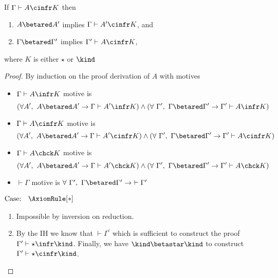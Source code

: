 
\begin{theorem}
    If $\Gamma \vdash A \cinfr K$ then 
    \begin{enumerate}
        \item {
            $A \betared A^\prime$ implies $\Gamma \vdash A^\prime \cinfr K$, and
        }
        \item {
            $\Gamma \betared \Gamma^\prime$ implies $\Gamma^\prime \vdash A \cinfr K$,
        }
    \end{enumerate}
    where $K$ is either $\star$ or $\kind$
\end{theorem}
\begin{proof}
    By induction on the proof derivation of $A$ with motives
    \begin{itemize}
        \item {
            $\Gamma \vdash A \infr K$ motive is
            $$(\forall A^\prime,\ A \betared A^\prime \to \Gamma \vdash A^\prime \infr K) \wedge (\forall\ \Gamma^\prime,\ \Gamma \betared \Gamma^\prime \to \Gamma^\prime \vdash A \infr K)$$
        }
        \item {
            $\Gamma \vdash A \cinfr K$ motive is
            $$(\forall A^\prime,\ A \betared A^\prime \to \Gamma \vdash A^\prime \cinfr K) \wedge (\forall\ \Gamma^\prime,\ \Gamma \betared \Gamma^\prime \to \Gamma^\prime \vdash A \cinfr K)$$
        }
        \item {
            $\Gamma \vdash A \chck K$ motive is
            $$(\forall A^\prime,\ A \betared A^\prime \to \Gamma \vdash A^\prime \chck K) \wedge (\forall\ \Gamma^\prime,\ \Gamma \betared \Gamma^\prime \to \Gamma^\prime \vdash A \chck K)$$
        }
        \item {
            $\vdash \Gamma$ motive is
            $\forall\ \Gamma^\prime,\ \Gamma \betared \Gamma^\prime \to\ \vdash \Gamma^\prime$
        }
    \end{itemize}

$\text{Case: }\begin{array}{c} \AxiomRule[*] \end{array}$
\begin{proofcase}
    \begin{enumerate}
        \item Impossible by inversion on reduction.
        \item {
            By the IH we know that $\vdash \Gamma^\prime$ which is sufficient to construct the proof $\Gamma^\prime \vdash \star \infr \kind$. Finally, we have $\kind \betastar \kind$ to construct $\Gamma^\prime \vdash \star \cinfr \kind$.
        }
    \end{enumerate}
\end{proofcase}


\end{proof}
